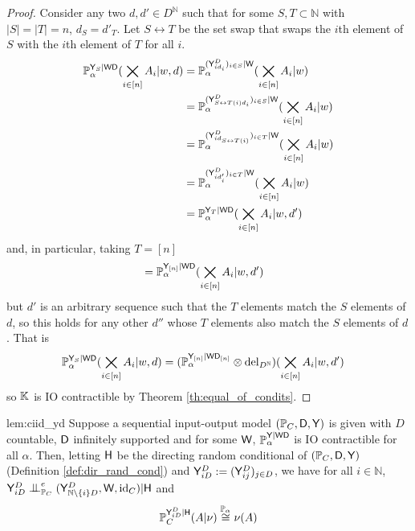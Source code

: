 \begin{proof}
Consider any two $d,d'\in D^{\mathbb{N}}$ such that for some $S,T\subset\mathbb{N}$ with $|S|=|T|=n$, $d_S=d'_T$. Let $S\leftrightarrow T$ be the set swap that swaps the $i$th element of $S$ with the $i$th element of $T$ for all $i$.
\begin{align}
    \mathbb{P}_\alpha^{\mathsf{Y}_S|\mathsf{WD}}(\bigtimes_{i\in [n]} A_i|w,d) &= \mathbb{P}_\alpha^{(\mathsf{Y}^D_{i d_i})_{i\in S}|\mathsf{W}} (\bigtimes_{i\in [n]} A_i|w)\\
    &= \mathbb{P}_\alpha^{(\mathsf{Y}^D_{S\leftrightarrow T(i) d_i})_{i\in S}|\mathsf{W}} (\bigtimes_{i\in [n]} A_i|w)\\
    &= \mathbb{P}_\alpha^{(\mathsf{Y}^D_{i d_{S\leftrightarrow T(i)}})_{i\in T}|\mathsf{W}} (\bigtimes_{i\in [n]} A_i|w)\\
    &= \mathbb{P}_\alpha^{(\mathsf{Y}^D_{i d'_{i}})_{i\in T}|\mathsf{W}} (\bigtimes_{i\in [n]} A_i|w)\\
    &=  \mathbb{P}_\alpha^{\mathsf{Y}_T|\mathsf{WD}}(\bigtimes_{i\in [n]} A_i|w,d')
\end{align}
and, in particular, taking $T=[n]$
\begin{align}
    &= \mathbb{P}_\alpha^{\mathsf{Y}_{[n]}|\mathsf{WD}} (\bigtimes_{i\in [n]} A_i|w,d')
\end{align}
but $d'$ is an arbitrary sequence such that the $T$ elements match the $S$ elements of $d$, so this holds for any other $d''$ whose $T$ elements also match the $S$ elements of $d$. That is
\begin{align}
    \mathbb{P}_\alpha^{\mathsf{Y}_S|\mathsf{WD}}(\bigtimes_{i\in [n]} A_i|w,d)&= (\mathbb{P}_\alpha^{\mathsf{Y}_{[n]}|\mathsf{WD}_{[n]}}\otimes \mathrm{del}_{D^{\mathbb{N}}}) (\bigtimes_{i\in [n]} A_i|w,d')
\end{align}
so $\mathbb{K}$ is IO contractible by Theorem \ref{th:equal_of_condits}.
\end{proof}

\begin{replemma}{lem:ciid_yd}
Suppose a sequential input-output model $(\mathbb{P}_C,\mathsf{D},\mathsf{Y})$ is given with $D$ countable, $\mathsf{D}$ infinitely supported and for some $\mathsf{W}$, $\mathbb{P}_\alpha^{\mathsf{Y}|\mathsf{WD}}$ is IO contractible for all $\alpha$. Then, letting $\mathsf{H}$ be the directing random conditional of $(\mathbb{P}_C,\mathsf{D},\mathsf{Y})$ (Definition \ref{def:dir_rand_cond}) and $\mathsf{Y}^D_{iD}:=(\mathsf{Y}^D_{ij})_{j\in D}$, we have for all $i\in\mathbb{N}$, $\RV{Y}^D_{iD}\CI^e_{\prob{P}_C} (\RV{Y}^D_{\mathbb{N}\setminus\{i\}D},\RV{W},\text{id}_C) | \RV{H}$ and
\begin{align}
    \mathbb{P}_C^{\mathsf{Y}^D_{iD}|\mathsf{H}}(A|\nu) \overset{\mathbb{P}_\alpha}{\cong} \nu(A)
\end{align}
\end{replemma}

